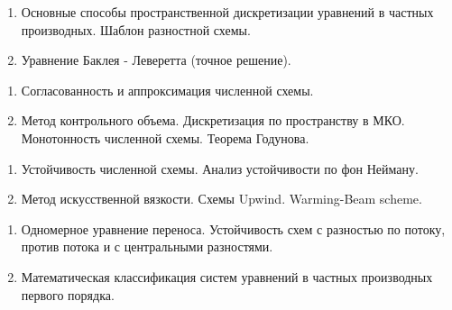 \documentclass[14pt,a4paper]{extarticle}
\begin{document}

    \begin{enumerate}

        \item Основные способы пространственной дискретизации уравнений в частных производных. Шаблон разностной схемы.

        \item Уравнение Баклея - Леверетта (точное решение).

    \end{enumerate}


    \begin{enumerate}

        \item Согласованность и аппроксимация численной схемы.

        \item Метод контрольного объема. Дискретизация по пространству в МКО. Монотонность численной схемы. Теорема Годунова.

    \end{enumerate}


    \begin{enumerate}

         \item Устойчивость численной схемы. Анализ устойчивости по фон Нейману.

         \item Метод искусственной вязкости. Схемы Upwind. Warming-Beam scheme.

    \end{enumerate}


    \begin{enumerate}

        \item Одномерное уравнение переноса. Устойчивость схем с разностью по потоку, против потока и с центральными разностями.

        \item Математическая классификация систем уравнений в частных производных первого порядка.

    \end{enumerate}
\end{document}
